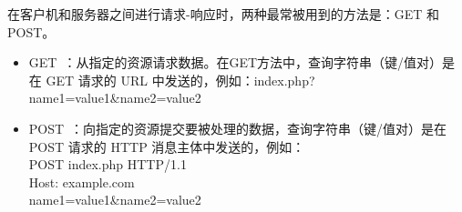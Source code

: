 在客户机和服务器之间进行请求-响应时，两种最常被用到的方法是：GET 和 POST。
\begin{itemize}
\item GET~：从指定的资源请求数据。在GET方法中，查询字符串（键/值对）是在 GET 请求的 URL 中发送的，例如：index.php?name1=value1\&name2=value2~
\item POST~：向指定的资源提交要被处理的数据，查询字符串（键/值对）是在 POST 请求的 HTTP 消息主体中发送的，例如：\\
POST index.php HTTP/1.1\\
Host: example.com\\
name1=value1\&name2=value2\\
\end{itemize}

